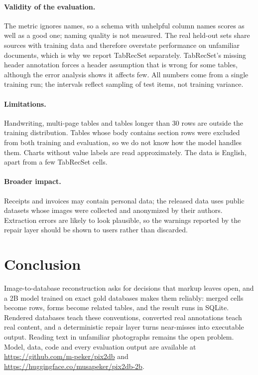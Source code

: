 \documentclass[10pt,twocolumn]{article}
\begin{document}
\paragraph{Validity of the evaluation.} The metric ignores names, so a schema with unhelpful column names scores
as well as a good one; naming quality is not measured. The real held-out sets share sources with training data
and therefore overstate performance on unfamiliar documents, which is why we report TabRecSet separately.
TabRecSet's missing header annotation forces a header assumption that is wrong for some tables, although the error
analysis shows it affects few. All numbers come from a single training run; the intervals reflect sampling of test
items, not training variance.

\paragraph{Limitations.} Handwriting, multi-page tables and tables longer than 30 rows are outside the training
distribution. Tables whose body contains section rows were excluded from both training and evaluation, so we do
not know how the model handles them. Charts without value labels are read approximately. The data is English,
apart from a few TabRecSet cells.

\paragraph{Broader impact.} Receipts and invoices may contain personal data; the released data uses public
datasets whose images were collected and anonymized by their authors. Extraction errors are likely to look
plausible, so the warnings reported by the repair layer should be shown to users rather than discarded.

\section{Conclusion}
Image-to-database reconstruction asks for decisions that markup leaves open, and a 2B model trained on exact
gold databases makes them reliably: merged cells become rows, forms become related tables, and the result runs
in SQLite. Rendered databases teach these conventions, converted real annotations teach real content, and a
deterministic repair layer turns near-misses into executable output. Reading text in unfamiliar photographs
remains the open problem. Model, data, code and every evaluation output are available at
\url{https://github.com/m-peker/pix2db} and \url{https://huggingface.co/musapeker/pix2db-2b}.
\end{document}

